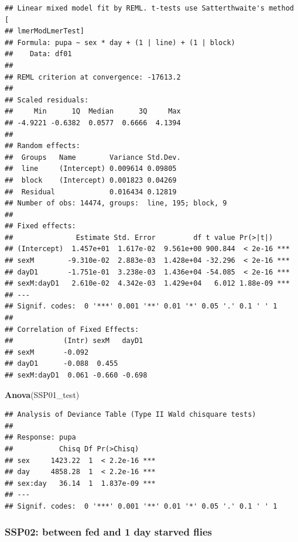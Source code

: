 \documentclass[
]{article}
\newenvironment{Shaded}{\begin{snugshade}}{\end{snugshade}}
\newcommand{\KeywordTok}[1]{\textcolor[rgb]{0.13,0.29,0.53}{\textbf{#1}}}
\newcommand{\NormalTok}[1]{#1}
\begin{document}
\begin{verbatim}
## Linear mixed model fit by REML. t-tests use Satterthwaite's method [
## lmerModLmerTest]
## Formula: pupa ~ sex * day + (1 | line) + (1 | block)
##    Data: df01
## 
## REML criterion at convergence: -17613.2
## 
## Scaled residuals: 
##     Min      1Q  Median      3Q     Max 
## -4.9221 -0.6382  0.0577  0.6666  4.1394 
## 
## Random effects:
##  Groups   Name        Variance Std.Dev.
##  line     (Intercept) 0.009614 0.09805 
##  block    (Intercept) 0.001823 0.04269 
##  Residual             0.016434 0.12819 
## Number of obs: 14474, groups:  line, 195; block, 9
## 
## Fixed effects:
##               Estimate Std. Error         df t value Pr(>|t|)    
## (Intercept)  1.457e+01  1.617e-02  9.561e+00 900.844  < 2e-16 ***
## sexM        -9.310e-02  2.883e-03  1.428e+04 -32.296  < 2e-16 ***
## dayD1       -1.751e-01  3.238e-03  1.436e+04 -54.085  < 2e-16 ***
## sexM:dayD1   2.610e-02  4.342e-03  1.429e+04   6.012 1.88e-09 ***
## ---
## Signif. codes:  0 '***' 0.001 '**' 0.01 '*' 0.05 '.' 0.1 ' ' 1
## 
## Correlation of Fixed Effects:
##            (Intr) sexM   dayD1 
## sexM       -0.092              
## dayD1      -0.088  0.455       
## sexM:dayD1  0.061 -0.660 -0.698
\end{verbatim}

\begin{Shaded}
\begin{Highlighting}[]
\KeywordTok{Anova}\NormalTok{(SSP01_test)}
\end{Highlighting}
\end{Shaded}

\begin{verbatim}
## Analysis of Deviance Table (Type II Wald chisquare tests)
## 
## Response: pupa
##           Chisq Df Pr(>Chisq)    
## sex     1423.22  1  < 2.2e-16 ***
## day     4858.28  1  < 2.2e-16 ***
## sex:day   36.14  1  1.837e-09 ***
## ---
## Signif. codes:  0 '***' 0.001 '**' 0.01 '*' 0.05 '.' 0.1 ' ' 1
\end{verbatim}

\hypertarget{ssp02-between-fed-and-1-day-starved-flies}{%
\subsubsection{SSP02: between fed and 1 day starved
flies}\label{ssp02-between-fed-and-1-day-starved-flies}}
\end{document}
